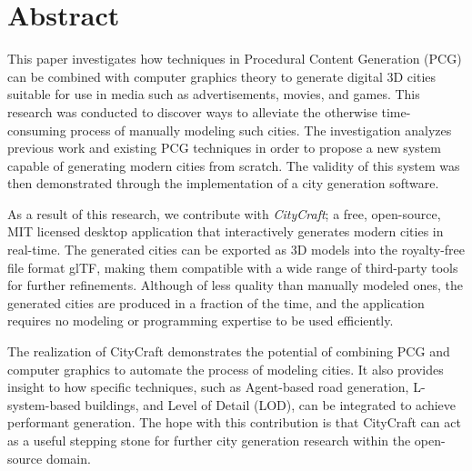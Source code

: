 \chapter*{Abstract}

This paper investigates how techniques in Procedural Content Generation (PCG) can be combined with computer graphics theory to generate digital 3D cities suitable for use in media such as advertisements, movies, and games.
This research was conducted to discover ways to alleviate the otherwise time-consuming process of manually modeling such cities.
The investigation analyzes previous work and existing PCG techniques in order to propose a new system capable of generating modern cities from scratch. 
The validity of this system was then demonstrated through the implementation of a city generation software.

As a result of this research, we contribute with \textit{CityCraft}; a free, open-source, MIT licensed desktop application that interactively generates modern cities in real-time.
The generated cities can be exported as 3D models into the royalty-free file format glTF, making them compatible with a wide range of third-party tools for further refinements.
Although of less quality than manually modeled ones, the generated cities are produced in a fraction of the time, and the application requires no modeling or programming expertise to be used efficiently.

The realization of CityCraft demonstrates the potential of combining PCG and computer graphics to automate the process of modeling cities.
It also provides insight to how specific techniques, such as Agent-based road generation, L-system-based buildings, and Level of Detail (LOD), can be integrated to achieve performant generation.
The hope with this contribution is that CityCraft can act as a useful stepping stone for further city generation research within the open-source domain.